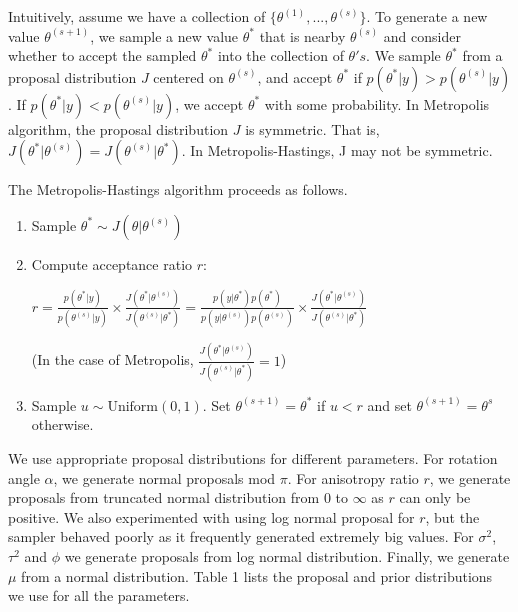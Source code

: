 \documentclass[12pt,twoside]{dukestatscithesis}
\theoremstyle{definition}
\theoremstyle{definition}
\theoremstyle{definition}
\theoremstyle{remark}
\begin{document}
Intuitively, assume we have a collection of
\(\{\theta^{(1)}, . . . , \theta^{(s)}\}\). To generate a new value
\(\theta^{(s+1)}\), we sample a new value \(\theta^*\) that is nearby
\(\theta^{(s)}\) and consider whether to accept the sampled \(\theta^*\)
into the collection of \(\theta's\). We sample \(\theta^*\) from a
proposal distribution \(J\) centered on \(\theta^{(s)}\), and accept
\(\theta^*\) if \(p(\theta^*|y) > p(\theta^{(s)}|y)\). If
\(p(\theta^*|y) < p(\theta^{(s)}|y)\), we accept \(\theta^*\) with some
probability. In Metropolis algorithm, the proposal distribution \(J\) is
symmetric. That is,
\(J(\theta^*|\theta^{(s)})=J(\theta^{(s)}|\theta^*)\). In
Metropolis-Hastings, J may not be symmetric.

The Metropolis-Hastings algorithm proceeds as follows.
\begin{enumerate}
\item Sample $\theta^* \sim J(\theta|\theta^{(s)})$
\item Compute acceptance ratio $r$:

$r = \displaystyle\frac{p(\theta^*|y)}{p(\theta^{(s)}|y)} \times \frac{J(\theta^*|\theta^{(s)})}{J(\theta^{(s)}|\theta^*)} = \displaystyle\frac{p(y|\theta^*)p(\theta^*)}{p(y|\theta^{(s)})p(\theta^{(s)})}\times \frac{J(\theta^*|\theta^{(s)})}{J(\theta^{(s)}|\theta^*)}$

(In the case of Metropolis, $\displaystyle\frac{J(\theta^*|\theta^{(s)})}{J(\theta^{(s)}|\theta^*)}=1$)
\item Sample $u \sim \text{Uniform}(0, 1)$. Set $\theta^{(s+1)} = \theta^*$ if $u < r$ and set $\theta^{(s+1)} = \theta^s$ otherwise.
\end{enumerate}
We use appropriate proposal distributions for different parameters. For
rotation angle \(\alpha\), we generate normal proposals mod \(\pi\). For
anisotropy ratio \(r\), we generate proposals from truncated normal
distribution from \(0\) to \(\infty\) as \(r\) can only be positive. We
also experimented with using log normal proposal for \(r\), but the
sampler behaved poorly as it frequently generated extremely big values.
For \(\sigma^2\), \(\tau^2\) and \(\phi\) we generate proposals from log
normal distribution. Finally, we generate \(\mu\) from a normal
distribution. Table 1 lists the proposal and prior distributions we use
for all the parameters.
\end{document}
